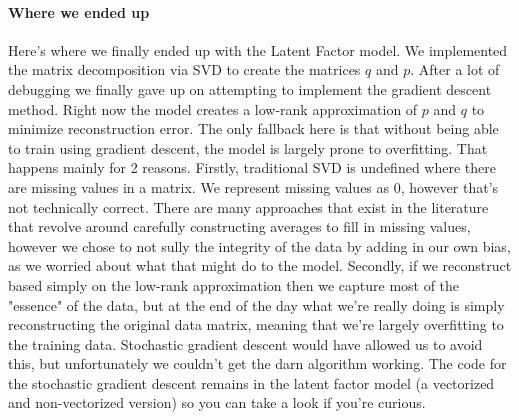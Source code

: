\documentclass[fleqn,10pt]{SelfArx} %
\begin{document}
\paragraph{Where we ended up} Here's where we finally ended up with the Latent Factor model. We implemented the matrix decomposition via SVD to create the matrices $q$ and $p$. After a lot of debugging we finally gave up on attempting to implement the gradient descent method. Right now the model creates a low-rank approximation of $p$ and $q$ to minimize reconstruction error. The only fallback here is that without being able to train using gradient descent, the model is largely prone to overfitting. That happens mainly for 2 reasons. Firstly, traditional SVD is undefined where there are missing values in a matrix. We represent missing values as $0$, however that's not technically correct. There are many approaches that exist in the literature that revolve around carefully constructing averages to fill in missing values, however we chose to not sully the integrity of the data by adding in our own bias, as we worried about what that might do to the model. Secondly, if we reconstruct based simply on the low-rank approximation then we capture most of the "essence" of the data, but at the end of the day what we're really doing is simply reconstructing the original data matrix, meaning that we're largely overfitting to the training data. Stochastic gradient descent would have allowed us to avoid this, but unfortunately we couldn't get the darn algorithm working. The code for the stochastic gradient descent remains in the latent factor model (a vectorized and non-vectorized version) so you can take a look if you're curious.







\end{document}
